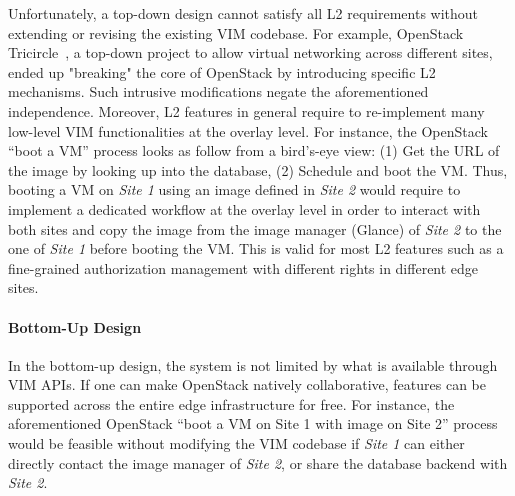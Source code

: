 Unfortunately, a top-down design cannot satisfy all L2 requirements
without extending or revising the existing VIM codebase. For example,
OpenStack Tricircle~\cite{tricircle}, a top-down project to allow
virtual networking across different sites, ended up "breaking" the
core of OpenStack by introducing specific L2 mechanisms. Such
intrusive modifications negate the aforementioned independence.
%
Moreover, L2 features in general require to
re-implement many low-level VIM functionalities at the overlay level. For
instance, the OpenStack ``boot a VM'' process looks as follow from a
bird's-eye view: (1) Get the URL of the image by looking up into the
database, (2) Schedule and boot the VM. Thus, booting a VM on
\emph{Site 1} using an image defined in \emph{Site 2} would require to
implement a dedicated workflow at the overlay level in order to
interact with both sites and copy the image from the image manager
(\ie Glance) of \emph{Site 2} to the one of \emph{Site 1} before booting the VM. 
%
This is valid for most L2 features such as a fine-grained authorization management
with different rights in different edge sites.
%





\paragraph{Bottom-Up Design}
In the bottom-up design, the system is not limited by what is
available through VIM APIs. If one can make OpenStack natively
collaborative, features can be supported across the entire
edge infrastructure for free. For instance, the aforementioned
OpenStack ``boot a VM on Site 1 with image on Site 2'' process would
be feasible without modifying the VIM codebase if \emph{Site 1} can
either directly contact the image manager of \emph{Site 2}, or share
the database backend with \emph{Site 2}.


